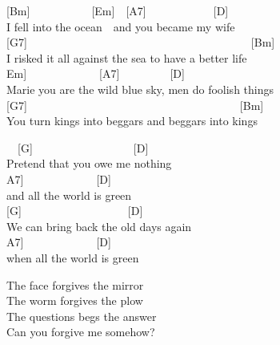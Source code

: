 \documentclass[
  letterpaper,
  twoside=false]{scrbook}
\begin{document}
{[}Bm{]}~~~~~~~~~~~{[}Em{]}~~{[}A7{]}~~~~~~~~~~~~{[}D{]}\\
I fell into the ocean~~and you became my wife\\
{[}G7{]}~~~~~~~~~~~~~~~~~~~~~~~~~~~~~~~~~~~~~~~~{[}Bm{]}\\
I risked it all against the sea to have a better life\\
\hspace*{0.333em}\hspace*{0.333em}\hspace*{0.333em}\hspace*{0.333em}\hspace*{0.333em}\hspace*{0.333em}\hspace*{0.333em}\hspace*{0.333em}\hspace*{0.333em}\hspace*{0.333em}{[}Em{]}~~~~~~~~~~~~~{[}A7{]}~~~~~~~~~{[}D{]}\\
Marie you are the wild blue sky, men do foolish things\\
{[}G7{]}~~~~~~~~~~~~~~~~~~~~~~~~~~~~~~~~~~~~~~{[}Bm{]}\\
You turn kings into beggars and beggars into kings

~~{[}G{]}~~~~~~~~~~~~~~~~~~{[}D{]}\\
Pretend that you owe me nothing~~~~~~\\
\hspace*{0.333em}\hspace*{0.333em}\hspace*{0.333em}{[}A7{]}~~~~~~~~~~~~~{[}D{]}\\
and all the world is green\\
{[}G{]}~~~~~~~~~~~~~~~~~~~{[}D{]}~~~~~~~~\\
We can bring back the old days again~~~~~\\
\hspace*{0.333em}\hspace*{0.333em}\hspace*{0.333em}\hspace*{0.333em}{[}A7{]}~~~~~~~~~~~~~{[}D{]}\\
when all the world is green

The face forgives the mirror\\
The worm forgives the plow\\
The questions begs the answer\\
Can you forgive me somehow?
\end{document}
